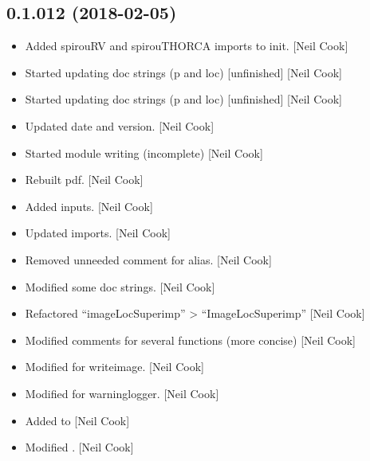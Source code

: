 \documentclass[a4paper,10pt,english]{report}
\begin{document}
\subsection{0.1.012 (2018-02-05)}
\label{\detokenize{misc/changelog:id491}}\begin{itemize}
\item {} 
Added spirouRV and spirouTHORCA imports to init. {[}Neil Cook{]}

\item {} 
Started updating doc strings (p and loc) {[}unfinished{]} {[}Neil Cook{]}

\item {} 
Started updating doc strings (p and loc) {[}unfinished{]} {[}Neil Cook{]}

\item {} 
Updated date and version. {[}Neil Cook{]}

\item {} 
Started module writing (incomplete) {[}Neil Cook{]}

\item {} 
Rebuilt pdf. {[}Neil Cook{]}

\item {} 
Added inputs. {[}Neil Cook{]}

\item {} 
Updated imports. {[}Neil Cook{]}

\item {} 
Removed unneeded comment for alias. {[}Neil Cook{]}

\item {} 
Modified some doc strings. {[}Neil Cook{]}

\item {} 
Refactored “imageLocSuperimp” \textendash{}\textgreater{} “ImageLocSuperimp” {[}Neil Cook{]}

\item {} 
Modified comments for several functions (more concise) {[}Neil Cook{]}

\item {} 
Modified  for writeimage. {[}Neil Cook{]}

\item {} 
Modified  for warninglogger. {[}Neil Cook{]}

\item {} 
Added to  {[}Neil Cook{]}

\item {} 
Modified  . {[}Neil Cook{]}


\end{itemize}
\end{document}
